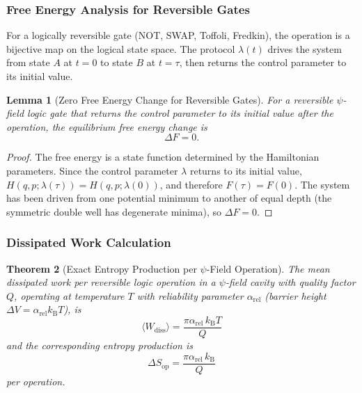 \documentclass[11pt,twocolumn]{article}
\newtheorem{theorem}{Theorem}[section]
\newtheorem{lemma}[theorem]{Lemma}
\theoremstyle{definition}
\theoremstyle{remark}
\newcommand{\kB}{k_{\mathrm{B}}}
\begin{document}
\subsubsection{Free Energy Analysis for Reversible Gates}

For a logically reversible gate (NOT, SWAP, Toffoli, Fredkin), the
operation is a bijective map on the logical state space. The protocol
$\lambda(t)$ drives the system from state $A$ at $t = 0$ to state $B$
at $t = \tau$, then returns the control parameter to its initial value.

\begin{lemma}[Zero Free Energy Change for Reversible Gates]
\label{lem:zero_dF}
For a reversible $\psi$-field logic gate that returns the control
parameter to its initial value after the operation, the equilibrium free
energy change is
\begin{equation}
\Delta F = 0.
\end{equation}
\end{lemma}

\begin{proof}
The free energy is a state function determined by the Hamiltonian
parameters. Since the control parameter $\lambda$ returns to its initial
value, $H(q,p;\lambda(\tau)) = H(q,p;\lambda(0))$, and therefore
$F(\tau) = F(0)$. The system has been driven from one potential minimum
to another of equal depth (the symmetric double well has degenerate
minima), so $\Delta F = 0$.
\end{proof}

\subsubsection{Dissipated Work Calculation}

\begin{theorem}[Exact Entropy Production per $\psi$-Field Operation]
\label{thm:entropy_production}
The mean dissipated work per reversible logic operation in a $\psi$-field
cavity with quality factor $Q$, operating at temperature $T$ with
reliability parameter $\alpha_{\mathrm{rel}}$ (barrier height $\Delta V
= \alpha_{\mathrm{rel}}\kB T$), is
\begin{equation}
\boxed{
\langle W_{\mathrm{diss}}\rangle
= \frac{\pi\alpha_{\mathrm{rel}}\,\kB T}{Q}
}
\label{eq:exact_dissipation}
\end{equation}
and the corresponding entropy production is
\begin{equation}
\boxed{
\Delta S_{\mathrm{op}} = \frac{\pi\alpha_{\mathrm{rel}}\,\kB}{Q}
}
\label{eq:exact_entropy}
\end{equation}
per operation.
\end{theorem}
\end{document}
